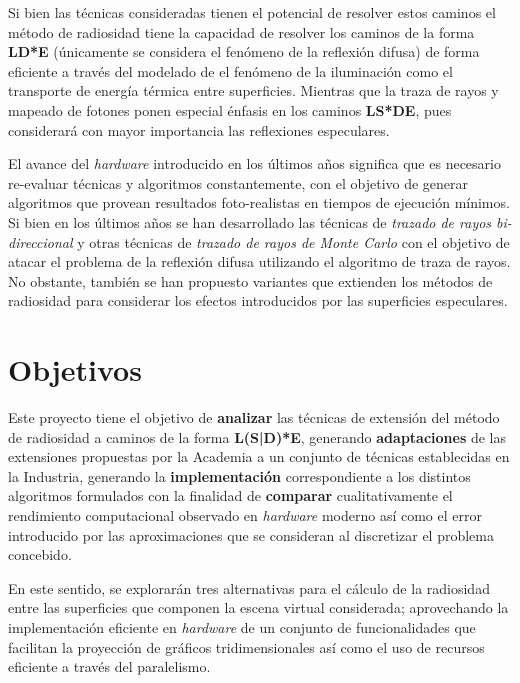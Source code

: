 Si bien las técnicas consideradas tienen el potencial de resolver estos caminos el método de radiosidad tiene la capacidad de resolver los caminos de la forma \textbf{LD*E} (únicamente se considera el fenómeno de la reflexión difusa) de forma eficiente a través del modelado de el fenómeno de la iluminación como el transporte de energía térmica entre superficies. Mientras que la traza de rayos y mapeado de fotones ponen especial énfasis en los caminos \textbf{LS*DE}, pues considerará con mayor importancia las reflexiones especulares.

El avance del \textit{hardware} introducido en los últimos años significa que es necesario re-evaluar técnicas y algoritmos constantemente, con el objetivo de generar algoritmos que provean resultados foto-realistas en tiempos de ejecución mínimos. Si bien en los últimos años se han desarrollado las técnicas de \textit{trazado de rayos bi-direccional} y otras técnicas de \textit{trazado de rayos de Monte Carlo} con el objetivo de atacar el problema de la reflexión difusa utilizando el algoritmo de traza de rayos. No obstante, también se han propuesto variantes que extienden los métodos de radiosidad para considerar los efectos introducidos por las superficies especulares.


\section{Objetivos}
\label{sec:objetivos}

Este proyecto tiene el objetivo de \textbf{analizar} las técnicas de extensión del método de radiosidad a caminos de la forma \textbf{L(S|D)*E}, generando \textbf{adaptaciones} de las extensiones propuestas por la Academia a un conjunto de técnicas establecidas en la Industria, generando la \textbf{implementación} correspondiente a los distintos algoritmos formulados con la finalidad de \textbf{comparar} cualitativamente el rendimiento computacional observado en \textit{hardware} moderno así como el error introducido por las aproximaciones que se consideran al discretizar el problema concebido.

En este sentido, se explorarán tres alternativas para el cálculo de la radiosidad entre las superficies que componen la escena virtual considerada; aprovechando la implementación eficiente en \textit{hardware} de un conjunto de funcionalidades que facilitan la proyección de gráficos tridimensionales así como el uso de recursos eficiente a través del paralelismo.  

